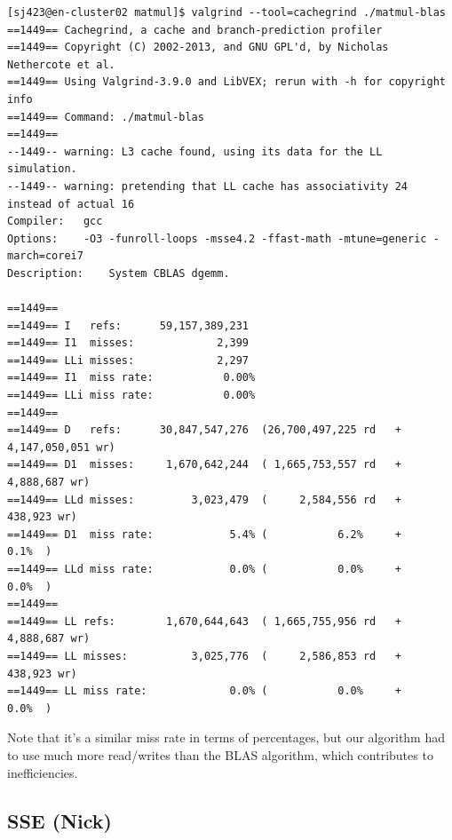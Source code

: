 \documentclass{article}
\begin{document}
    \begin{lstlisting}
[sj423@en-cluster02 matmul]$ valgrind --tool=cachegrind ./matmul-blas 
==1449== Cachegrind, a cache and branch-prediction profiler
==1449== Copyright (C) 2002-2013, and GNU GPL'd, by Nicholas Nethercote et al.
==1449== Using Valgrind-3.9.0 and LibVEX; rerun with -h for copyright info
==1449== Command: ./matmul-blas
==1449== 
--1449-- warning: L3 cache found, using its data for the LL simulation.
--1449-- warning: pretending that LL cache has associativity 24 instead of actual 16
Compiler:	gcc
Options:	-O3 -funroll-loops -msse4.2 -ffast-math -mtune=generic -march=corei7
Description:	System CBLAS dgemm.

==1449== 
==1449== I   refs:      59,157,389,231
==1449== I1  misses:             2,399
==1449== LLi misses:             2,297
==1449== I1  miss rate:           0.00%
==1449== LLi miss rate:           0.00%
==1449== 
==1449== D   refs:      30,847,547,276  (26,700,497,225 rd   + 4,147,050,051 wr)
==1449== D1  misses:     1,670,642,244  ( 1,665,753,557 rd   +     4,888,687 wr)
==1449== LLd misses:         3,023,479  (     2,584,556 rd   +       438,923 wr)
==1449== D1  miss rate:            5.4% (           6.2%     +           0.1%  )
==1449== LLd miss rate:            0.0% (           0.0%     +           0.0%  )
==1449== 
==1449== LL refs:        1,670,644,643  ( 1,665,755,956 rd   +     4,888,687 wr)
==1449== LL misses:          3,025,776  (     2,586,853 rd   +       438,923 wr)
==1449== LL miss rate:             0.0% (           0.0%     +           0.0%  )
    \end{lstlisting}

    Note that it's a similar miss rate in terms of percentages, but our algorithm had to
    use much more read/writes than the BLAS algorithm, which contributes to inefficiencies.

    \subsection{SSE (Nick)}
\end{document}
